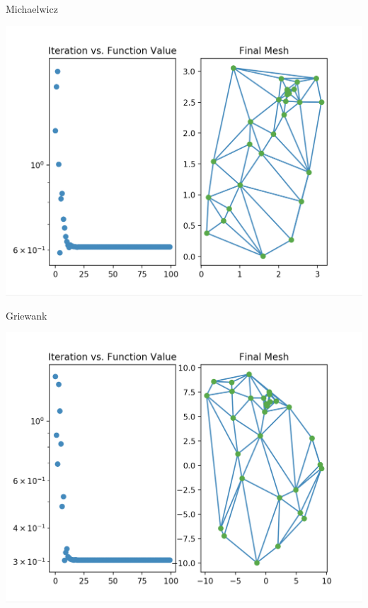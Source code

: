 \documentclass[xcolor=dvipsnames]{beamer}
\begin{document}
\begin{frame}{Michaelwicz}
\begin{center}
\includegraphics[width=0.8\columnwidth]{../img/delaunay_search/ds-MichaelwiczError.png}
\end{center}
\end{frame}
\begin{frame}{Griewank}
\begin{center}
\includegraphics[width=0.8\columnwidth]{../img/delaunay_search/ds-GriewankError.png}
\end{center}
\end{frame}
\end{document}

